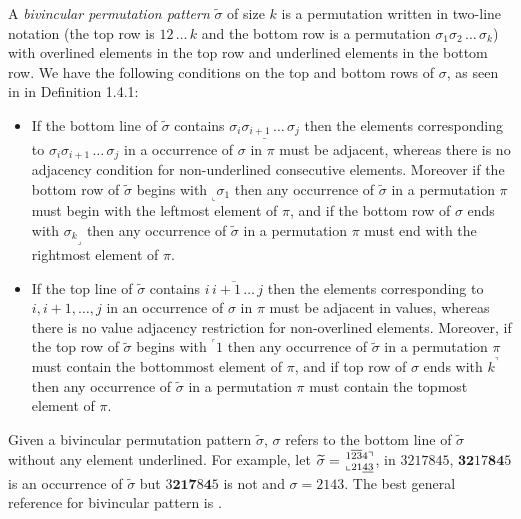 \documentclass[a4paper]{llncs}
\newcommand\BV[2]{\genfrac{}{}{0pt}{}{#1}{#2}}
\begin{document}
A \emph{bivincular permutation pattern} $\widetilde{\sigma}$
of size $k$ is a permutation written in
two-line notation
(the top row is $12\,\ldots\,k$ and the bottom row
is a permutation $\sigma_1\sigma_2\,\ldots\,\sigma_k$)
with overlined elements in the top row and underlined elements in the bottom row.
We have the following conditions on the top and bottom rows
of $\sigma$, as seen in \cite{Kitaev:book:2011} in Definition 1.4.1:
\begin{itemize}
	\item
	If the bottom line of $\widetilde{\sigma}$ contains
	$\underline{\sigma_i\sigma_{i+1}\,\ldots\,\sigma_j}$
	then the elements corresponding to
	$\sigma_i\sigma_{i+1}\,\ldots\,\sigma_j$ in a occurrence of
	$\sigma$ in $\pi$ must be adjacent, whereas there is
	no adjacency condition for
	non-underlined consecutive elements.
	Moreover if the bottom row of $\widetilde{\sigma}$ begins with
	$_\llcorner{\sigma_1}$ then any occurrence of $\widetilde{\sigma}$
	in a permutation $\pi$ must begin with the leftmost
	element of $\pi$,
	and
	if the bottom row of $\sigma$ ends with
	${\sigma_k}_\lrcorner$ then any occurrence of $\widetilde{\sigma}$
	in a permutation $\pi$ must end with the rightmost
	element of $\pi$.
	\item
	If the top line of $\widetilde{\sigma}$ contains
	$\overline{i\,i+1\,\ldots\,j}$ then the elements corresponding to
	$i, i+1, \ldots, j$ in an
	occurrence of $\sigma$ in $\pi$ must be adjacent in values,
	whereas there is no value adjacency restriction for non-overlined
	elements.
	Moreover, if the top row of $\widetilde{\sigma}$ begins with
	$^\ulcorner{1}$ then
	any occurrence of $\widetilde{\sigma}$ in a permutation $\pi$ must contain
	the bottommost element of $\pi$, and
	if top row of $\sigma$ ends with $k^\urcorner$ then
	any occurrence of $\widetilde{\sigma}$ in a permutation $\pi$ must contain
	the topmost element of $\pi$.
\end{itemize}

Given a bivincular permutation pattern $\widetilde{\sigma}$,
$\sigma$ refers to the bottom line of $\widetilde{\sigma}$
without any element underlined.
For example,
let
$\widetilde{\sigma} = \BV{1\overline{23}4\urcorner}{\llcorner 21\underline{43}}$,
in $3217845$, $\textbf{32}17\textbf{84}5$ is an occurrence  of $\widetilde{\sigma}$ but $3\textbf{21}\textbf{7}8\textbf{4}5$ is not
and $\sigma = 2143$.
The best general reference for bivincular pattern is \cite{Kitaev:book:2011}.
\end{document}
